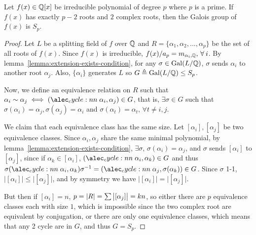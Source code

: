 \begin{prop}
  Let $f(x) \in \mathbb{Q}[x]$ be irreducible polynomial of degree $p$ where $p$ is a prime.
  If $f(x)$ has exactly $p-2$ roots and $2$ complex roots, then the Galois group of $f(x)$ is $S_p$.

  \begin{proof}
    Let $L$ be a splitting field of $f$ over $\mathbb{Q}$ and $R = \{ \alpha_1, \alpha_2, \dots, \alpha_p \}$ be
    the set of all roots of $f(x)$. Since $f(x)$ is irreducible, $f(x) / a_p = m_{\alpha_i, \Qb}, \, \forall i$.
    By lemma~\ref{lemma:extension-exists-condition}, for any $\sigma \in \operatorname{Gal}(L/\mathbb{Q})$, $\sigma$ sends
    $\alpha_i$ to another root $\alpha_j$. Also, $\{\alpha_i\}$ generates $L$ so
    $G \triangleq \operatorname{Gal}(L/\mathbb{Q}) \leq S_p$.

    Now, we define an equivalence relation on $R$ such that $\alpha_i \sim \alpha_j \iff
    \cycle{\alpha_i, \alpha_j} \in G$, that is, $\exists \sigma \in G$ such that $\sigma(\alpha_i) = \alpha_j,
    \sigma(\alpha_j) = \alpha_i$ and $\sigma(\alpha_t) = \alpha_t, \, \forall t \neq i, j$.

    We claim that each equivalence class has the same size. Let $[\alpha_i], [\alpha_j]$ be
    two equivalence classes. Since $\alpha_i, \alpha_j$ share the same minimal polynomial,
    by lemma~\ref{lemma:extension-exists-condition}, $\exists \sigma,\, \sigma(\alpha_i) = \alpha_j$,
    and $\sigma$ sends $[\alpha_i]$ to $[\alpha_j]$, since if $\alpha_k \in [\alpha_i]$,
    $\cycle{\alpha_i, \alpha_k} \in G$ and thus $\sigma \cycle{\alpha_i, \alpha_k} \sigma^{-1}
    = \cycle{\alpha_j, \sigma(\alpha_k)} \in G$. Since $\sigma$ 1-1, $\big| [\alpha_i] \big| \leq \big| [\alpha_j] \big|$,
    and by symmetry we have $\big| [\alpha_i] \big| = \big| [\alpha_j] \big|$.

    But then if $[\alpha_i] = n$, $p = \lvert R\rvert = \sum \big| [\alpha_j] \big| = kn$,
    so either there are $p$ equivalence classes each with size $1$, which is impossible since
    the two complex root are equivalent by conjugation, or there are only one equivalence classes,
    which means that any 2 cycle are in $G$, and thus $G = S_p$.
  \end{proof}
\end{prop}

